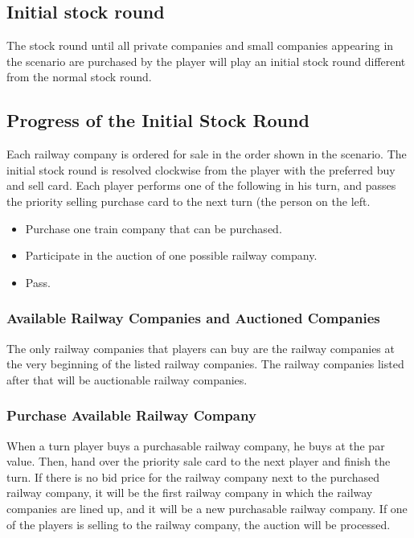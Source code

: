 \documentclass{article}
\begin{document}
\begin{CJK}{UTF8}{min}


\section{Initial stock round}

The stock round until all private companies and small companies
appearing in the scenario are purchased by the player will play an
initial stock round different from the normal stock round.

\subsection{Progress of the Initial Stock Round}
Each railway company is ordered for sale in the order shown in the
scenario. The initial stock round is resolved clockwise from the
player with the preferred buy and sell card. Each player performs one
of the following in his turn, and passes the priority selling purchase
card to the next turn (the person on the left.

\begin{itemize}

\item Purchase one train company that can be purchased.
\item Participate in the auction of one possible railway company.
\item Pass.
\end{itemize}

\subsubsection{Available Railway Companies and Auctioned Companies}
The only railway companies that players can buy are the railway
companies at the very beginning of the listed railway companies. The
railway companies listed after that will be auctionable railway
companies.

\subsubsection{Purchase Available Railway Company}
When a turn player buys a purchasable railway company, he buys at the
par value. Then, hand over the priority sale card to the next player
and finish the turn. If there is no bid price for the railway company
next to the purchased railway company, it will be the first railway
company in which the railway companies are lined up, and it will be a
new purchasable railway company. If one of the players is selling to
the railway company, the auction will be processed.


\end{CJK}
\end{document}

